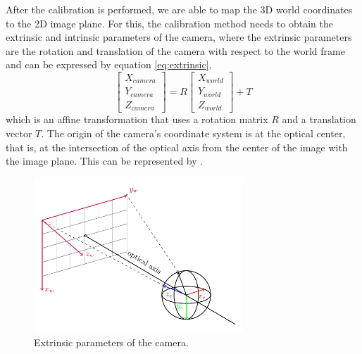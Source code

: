 After the calibration is performed, we are able to map the 3D world coordinates to the 2D image plane. For this, the calibration method needs to obtain the extrinsic
and intrinsic parameters of the camera, where the extrinsic parameters are the rotation and translation of the camera with respect to the world frame and can be expressed by equation \ref{eq:extrinsic},
\begin{equation}
	\begin{bmatrix}
		X_{camera} \\
		Y_{camera} \\
		Z_{camera}
	\end{bmatrix}
	= R 
  \begin{bmatrix}
	X_{world} \\
	Y_{world} \\
	Z_{world}
  \end{bmatrix}
  + T
  \label{eq:extrinsic}
\end{equation}
which is an affine transformation that uses a rotation matrix $R$ and a translation vector $T$. The origin of the camera's coordinate system is at the optical center,
that is, at the intersection of the optical axis from the center of the image with the image plane. This can be represented by .

\begin{figure}[H]
  \centering
  \includegraphics[width=0.7\textwidth]{./fig/tikz/extrinsic.pdf}
  \caption{Extrinsic parameters of the camera.}
  \label{fig:camera_extrinsic}
\end{figure}

